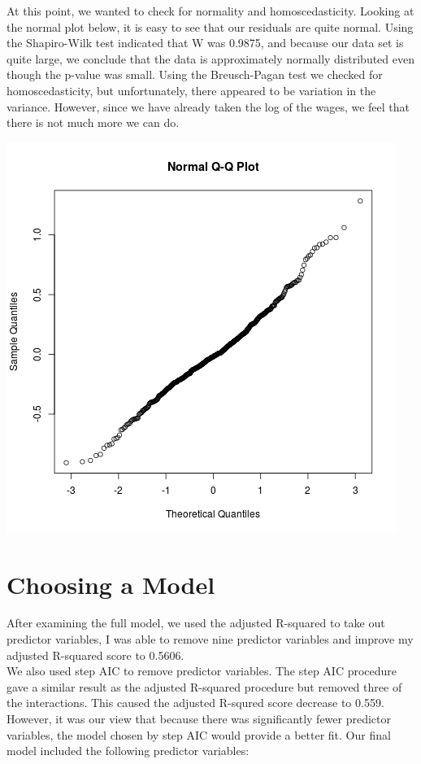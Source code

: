 \documentclass[12pt,a4paper,twoside]{article}
\begin{document}
At this point, we wanted to check for normality and homoscedasticity. Looking at the normal plot below, it is easy to see that our residuals are quite normal. Using the Shapiro-Wilk test indicated that W was 0.9875, and because our data set is quite large, we conclude that the data is approximately normally distributed even though the p-value was small. Using the Breusch-Pagan test we checked for homoscedasticity, but unfortunately, there appeared to be variation in the variance. However, since we have already taken the log of the wages, we feel that there is not much more we can do.\\
\begin{center}
\includegraphics[scale=.4]{norm.png}
\end{center}

\section{Choosing a Model}

After examining the full model, we used the adjusted R-squared to take out predictor variables, I was able to remove nine predictor variables and improve my adjusted R-squared score to 0.5606.\\

We also used step AIC to remove predictor variables. The step AIC procedure gave a similar result as the adjusted R-squared procedure but removed three of the interactions. This caused the adjusted R-squred score decrease to 0.559. However, it was our view that because there was significantly fewer predictor variables, the model chosen by step AIC would provide a better fit. Our final model included the following predictor variables:\\ 
\end{document}
